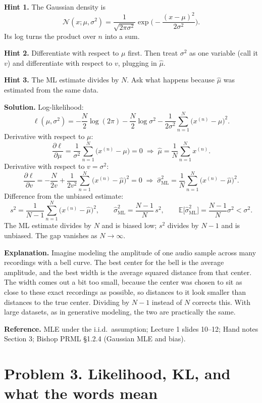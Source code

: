 \documentclass[11pt]{article}
\begin{document}
\textbf{Hint 1.} The Gaussian density is
\[
\mathcal{N}(x;\mu,\sigma^2) = \frac{1}{\sqrt{2\pi\sigma^2}}\exp\!\Big(-\frac{(x-\mu)^2}{2\sigma^2}\Big).
\]
Its log turns the product over $n$ into a sum.

\textbf{Hint 2.} Differentiate with respect to $\mu$ first. Then treat $\sigma^2$ as one variable (call it $v$) and differentiate with respect to $v$, plugging in $\hat\mu$.

\textbf{Hint 3.} The ML estimate divides by $N$. Ask what happens because $\hat\mu$ was estimated from the same data.

\textbf{Solution.} Log-likelihood:
\[
\ell(\mu,\sigma^2) = -\frac{N}{2}\log(2\pi) - \frac{N}{2}\log\sigma^2 - \frac{1}{2\sigma^2}\sum_{n=1}^{N}\big(x^{(n)}-\mu\big)^2.
\]
Derivative with respect to $\mu$:
\[
\frac{\partial\ell}{\partial\mu} = \frac{1}{\sigma^2}\sum_{n=1}^{N}\big(x^{(n)}-\mu\big) = 0
\;\Rightarrow\; \hat\mu = \frac{1}{N}\sum_{n=1}^{N}x^{(n)}.
\]
Derivative with respect to $v=\sigma^2$:
\[
\frac{\partial\ell}{\partial v} = -\frac{N}{2v} + \frac{1}{2v^2}\sum_{n=1}^{N}\big(x^{(n)}-\hat\mu\big)^2 = 0
\;\Rightarrow\; \hat\sigma^2_{\text{ML}} = \frac{1}{N}\sum_{n=1}^{N}\big(x^{(n)}-\hat\mu\big)^2.
\]
Difference from the unbiased estimate:
\[
s^2 = \frac{1}{N-1}\sum_{n=1}^{N}\big(x^{(n)}-\hat\mu\big)^2, \qquad
\hat\sigma^2_{\text{ML}} = \frac{N-1}{N}\,s^2,
\qquad
\mathbb{E}\big[\hat\sigma^2_{\text{ML}}\big] = \frac{N-1}{N}\sigma^2 < \sigma^2.
\]
The ML estimate divides by $N$ and is biased low; $s^2$ divides by $N-1$ and is unbiased. The gap vanishes as $N\to\infty$.

\textbf{Explanation.} Imagine modeling the amplitude of one audio sample across many recordings with a bell curve. The best center for the bell is the average amplitude, and the best width is the average squared distance from that center. The width comes out a bit too small, because the center was chosen to sit as close to these exact recordings as possible, so distances to it look smaller than distances to the true center. Dividing by $N-1$ instead of $N$ corrects this. With large datasets, as in generative modeling, the two are practically the same.

\textbf{Reference.} MLE under the i.i.d.\ assumption; Lecture 1 slides 10--12; Hand notes Section 3; Bishop PRML \S1.2.4 (Gaussian MLE and bias).

\section*{Problem 3. Likelihood, KL, and what the words mean}
\end{document}
